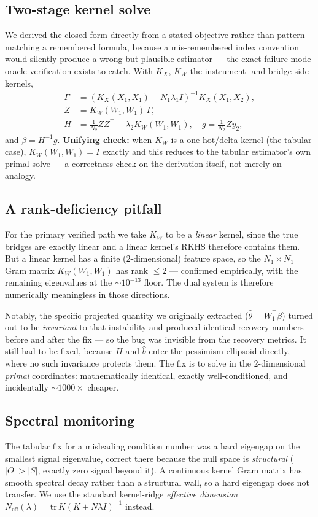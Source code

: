 \subsection{Two-stage kernel solve}
We derived the closed form directly from a stated objective rather than
pattern-matching a remembered formula, because a mis-remembered index convention
would silently produce a wrong-but-plausible estimator --- the exact failure mode
oracle verification exists to catch. With $K_X$, $K_W$ the instrument- and
bridge-side kernels,
\begin{align}
\Gamma &= \left(K_X(X_1,X_1) + N_1\lambda_1 I\right)^{-1} K_X(X_1,X_2), \\
Z &= K_W(W_1,W_1)\,\Gamma, \\
H &= \tfrac{1}{N_2} Z Z^\top + \lambda_2 K_W(W_1,W_1), \quad
g = \tfrac{1}{N_2} Z y_2,
\end{align}
and $\beta = H^{-1} g$. \textbf{Unifying check:} when $K_W$ is a one-hot/delta
kernel (the tabular case), $K_W(W_1,W_1) = I$ exactly and this reduces to the
tabular estimator's own primal solve --- a correctness check on the derivation
itself, not merely an analogy.

\subsection{A rank-deficiency pitfall}
For the primary verified path we take $K_W$ to be a \emph{linear} kernel, since
the true bridges are exactly linear and a linear kernel's RKHS therefore contains
them. But a linear kernel has a finite ($2$-dimensional) feature space, so the
$N_1 \times N_1$ Gram matrix $K_W(W_1,W_1)$ has rank $\le 2$ --- confirmed
empirically, with the remaining eigenvalues at the $\sim\!10^{-13}$ floor. The
dual system is therefore numerically meaningless in those directions.

Notably, the specific projected quantity we originally extracted
($\hat\theta = W_1^\top \beta$) turned out to be \emph{invariant} to that
instability and produced identical recovery numbers before and after the fix ---
so the bug was invisible from the recovery metrics. It still had to be fixed,
because $H$ and $\hat b$ enter the pessimism ellipsoid directly, where no such
invariance protects them. The fix is to solve in the $2$-dimensional
\emph{primal} coordinates: mathematically identical, exactly well-conditioned,
and incidentally $\sim\!1000\times$ cheaper.

\subsection{Spectral monitoring}
The tabular fix for a misleading condition number was a hard eigengap on the
smallest signal eigenvalue, correct there because the null space is
\emph{structural} ($|O| > |S|$, exactly zero signal beyond it). A continuous
kernel Gram matrix has smooth spectral decay rather than a structural wall, so a
hard eigengap does not transfer. We use the standard kernel-ridge
\emph{effective dimension} $N_{\mathrm{eff}}(\lambda) = \mathrm{tr}\,K(K + N\lambda I)^{-1}$
\citep{caponnetto2007} instead.

